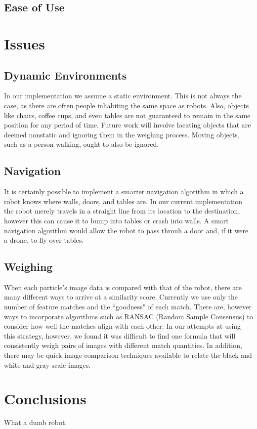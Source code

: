 \documentclass[a4paper,11pt]{article}
\begin{document}
\subsection{Ease of Use}


\section{Issues}
\subsection{Dynamic Environments}
In our implementation we assume a static environment. This is not always the case, as there are often people inhabiting the same space as robots. Also, objects like chairs, coffee cups, and even tables are not guaranteed to remain in the same position for any period of time. Future work will involve locating objects that are deemed nonstatic and ignoring them in the weighing process. Moving objects, such as a person walking, ought to also be ignored.

\subsection{Navigation}
It is certainly possible to implement a smarter navigation algorithm in which a robot knows where walls, doors, and tables are. In our current implementation the robot merely travels in a straight line from its location to the destination, however this can cause it to bump into tables or crash into walls. A smart navigation algorithm would allow the robot to pass throuh a door and, if it were a drone, to fly over tables.

\subsection{Weighing}
When each particle's image data is compared with that of the robot, there are many different ways to arrive at a similarity score. Currently we use only the number of feature matches and the ``goodness" of each match. There are, however ways to incorporate algorithms such as RANSAC (Random Sample Consensus) to consider how well the matches align with each other. In our attempts at using this strategy, however, we found it was difficult to find one formula that will consistently weigh pairs of images with different match quantities. In addition, there may be quick image comparison techniques available to relate the black and white and gray scale images.

\section{Conclusions}
What a dumb robot.








  
\end{document}
